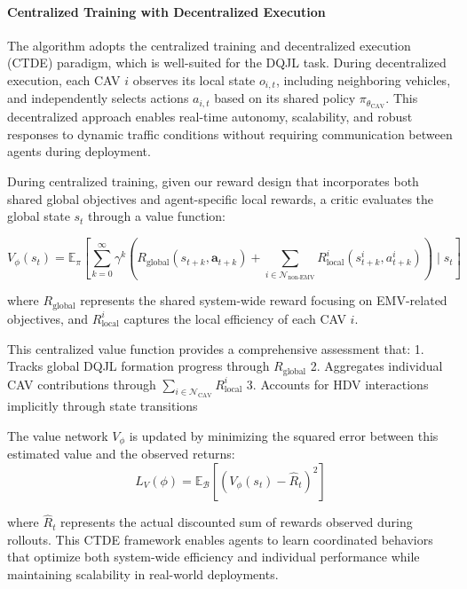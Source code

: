 \paragraph{Centralized Training with Decentralized Execution}
The algorithm adopts the centralized training and decentralized execution (CTDE) paradigm, which is well-suited for the DQJL task. During decentralized execution, each CAV $i$ observes its local state $o_{i,t}$, including neighboring vehicles, and independently selects actions $a_{i,t}$ based on its shared policy $\pi_{\theta_{\text{CAV}}}$. This decentralized approach enables real-time autonomy, scalability, and robust responses to dynamic traffic conditions without requiring communication between agents during deployment.

During centralized training, given our reward design that incorporates both shared global objectives and agent-specific local rewards, a critic evaluates the global state $s_t$ through a value function:

\begin{equation}
V_\phi(s_t) = \mathbb{E}_{\pi} \left[ \sum_{k=0}^\infty \gamma^k \left(R_{\text{global}}(s_{t+k}, \mathbf{a}_{t+k}) + \sum_{i \in \mathcal{N}_{\text{non-EMV}}} R^i_{\text{local}}(s^i_{t+k}, a^i_{t+k})\right) \mid s_t \right]
\end{equation}

where $R_{\text{global}}$ represents the shared system-wide reward focusing on EMV-related objectives, and $R^i_{\text{local}}$ captures the local efficiency of each CAV $i$.

This centralized value function provides a comprehensive assessment that:
1. Tracks global DQJL formation progress through $R_{\text{global}}$
2. Aggregates individual CAV contributions through $\sum_{i \in \mathcal{N}_{\text{CAV}}} R^i_{\text{local}}$
3. Accounts for HDV interactions implicitly through state transitions

The value network $V_{\phi}$ is updated by minimizing the squared error between this estimated value and the observed returns:
\begin{equation}
    L_V(\phi) = \mathbb{E}_{\mathcal{B}} \left[ \left( V_{\phi}(s_t) - \hat{R}_t \right)^2 \right]
\end{equation}

where $\hat{R}_t$ represents the actual discounted sum of rewards observed during rollouts. This CTDE framework enables agents to learn coordinated behaviors that optimize both system-wide efficiency and individual performance while maintaining scalability in real-world deployments.

